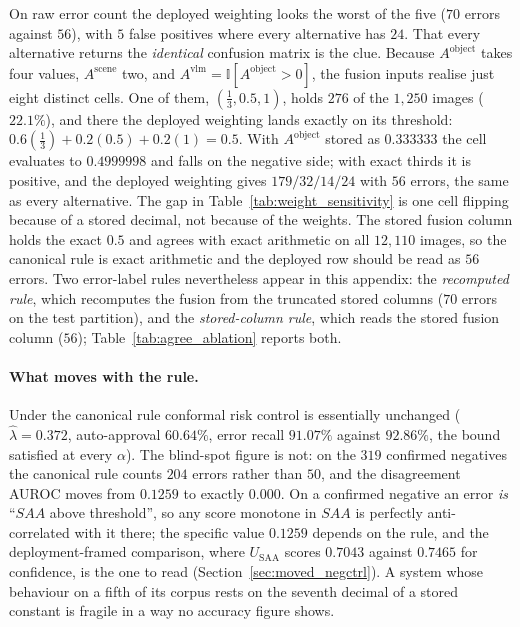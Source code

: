 \documentclass[12pt,a4paper]{report}
\begin{document}
On raw error count the deployed weighting looks the worst of the five ($70$ errors against $56$), with $5$ false positives where every alternative has $24$. That every alternative returns the \emph{identical} confusion matrix is the clue. Because $A^{\text{object}}$ takes four values, $A^{\text{scene}}$ two, and $A^{\text{vlm}} = \mathbb{I}[A^{\text{object}}>0]$, the fusion inputs realise just eight distinct cells. One of them, $(\tfrac13, 0.5, 1)$, holds $276$ of the $1{,}250$ images ($22.1\%$), and there the deployed weighting lands exactly on its threshold: $0.6(\tfrac13) + 0.2(0.5) + 0.2(1) = 0.5$. With $A^{\text{object}}$ stored as $0.333333$ the cell evaluates to $0.4999998$ and falls on the negative side; with exact thirds it is positive, and the deployed weighting gives $179/32/14/24$ with $56$ errors, the same as every alternative. The gap in Table~\ref{tab:weight_sensitivity} is one cell flipping because of a stored decimal, not because of the weights. The stored fusion column holds the exact $0.5$ and agrees with exact arithmetic on all $12{,}110$ images, so the canonical rule is exact arithmetic and the deployed row should be read as $56$ errors. Two error-label rules nevertheless appear in this appendix: the \emph{recomputed rule}, which recomputes the fusion from the truncated stored columns ($70$ errors on the test partition), and the \emph{stored-column rule}, which reads the stored fusion column ($56$); Table~\ref{tab:agree_ablation} reports both.

\paragraph{What moves with the rule.} Under the canonical rule conformal risk control is essentially unchanged ($\hat\lambda = 0.372$, auto-approval $60.64\%$, error recall $91.07\%$ against $92.86\%$, the bound satisfied at every $\alpha$). The blind-spot figure is not: on the $319$ confirmed negatives the canonical rule counts $204$ errors rather than $50$, and the disagreement AUROC moves from $0.1259$ to exactly $0.000$. On a confirmed negative an error \emph{is} ``$SAA$ above threshold'', so any score monotone in $SAA$ is perfectly anti-correlated with it there; the specific value $0.1259$ depends on the rule, and the deployment-framed comparison, where $U_{\text{SAA}}$ scores $0.7043$ against $0.7465$ for confidence, is the one to read (Section~\ref{sec:moved_negctrl}). A system whose behaviour on a fifth of its corpus rests on the seventh decimal of a stored constant is fragile in a way no accuracy figure shows.
\end{document}
